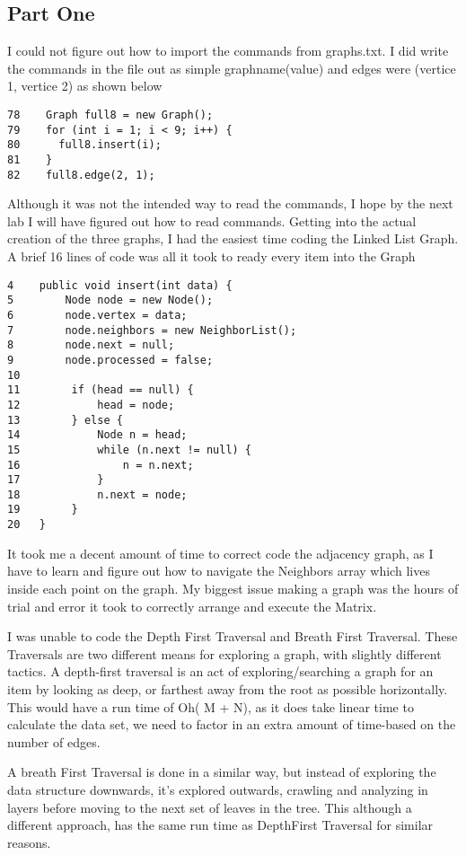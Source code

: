 \documentclass{article}
\begin{document}
\subsection{Part One}
I could not figure out how to import the commands from graphs.txt. I did write the commands in the file out as simple graphname(value) and edges were (vertice 1, vertice 2) as shown below
\begin{verbatim}
78    Graph full8 = new Graph();
79    for (int i = 1; i < 9; i++) {
80      full8.insert(i);
81    }
82    full8.edge(2, 1);
\end{verbatim}
Although it was not the intended way to read the commands, I hope by the next lab I will have figured out how to read commands. Getting into the actual creation of the three graphs, I had the easiest time coding the Linked List Graph. A brief 16 lines of code was all it took to ready every item into the Graph
\begin{verbatim}
4    public void insert(int data) {
5        Node node = new Node();
6        node.vertex = data;
7        node.neighbors = new NeighborList();
8        node.next = null;
9        node.processed = false;
10
11        if (head == null) {
12            head = node;
13        } else {
14            Node n = head;
15            while (n.next != null) {
16                n = n.next;
17            }
18            n.next = node;
19        }
20   }
\end{verbatim}
It took me a decent amount of time to correct code the adjacency graph, as I have to learn and figure out how to navigate the Neighbors array which lives inside each point on the graph. My biggest issue making a graph was the hours of trial and error it took to correctly arrange and execute the Matrix.

I was unable to code the Depth First Traversal and Breath First Traversal. These Traversals are two different means for exploring a graph, with slightly different tactics. A depth-first traversal is an act of exploring/searching a graph for an item by looking as deep, or farthest away from the root as possible horizontally. This would have a run time of Oh( M + N), as it does take linear time to calculate the data set, we need to factor in an extra amount of time-based on the number of edges.

A breath First Traversal is done in a similar way, but instead of exploring the data structure downwards, it's explored outwards, crawling and analyzing in layers before moving to the next set of leaves in the tree. This although a different approach, has the same run time as DepthFirst Traversal for similar reasons.
\end{document}
